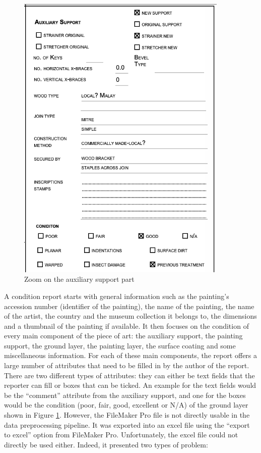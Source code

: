 \documentclass[11pt, oneside]{article}
\begin{document}
\begin{figure}[H]
\begin{minipage}{0.5\textwidth}
        \includegraphics[width=0.9\textwidth]{images/zoomOnReportFields.png} %
        \caption{Zoom on the auxiliary support part}
        \label{fig:zoomOnAuxiliary Report}
    \end{minipage}
\end{figure}

\noindent A condition report starts with general information such as the painting’s accession number (identifier of the painting), the name of the painting, the name of the artist, the country and the museum collection it belongs to, the dimensions and a thumbnail of the painting if available. It then focuses on the condition of every main component of the piece of art: the auxiliary support, the painting support, the ground layer, the painting layer, the surface coating and some miscellaneous information.
\bigbreak
\noindent For each of these main components, the report offers a large number of attributes that need to be filled in by the author of the report. There are two different types of attributes: they can either be text fields that the reporter can fill or boxes that can be ticked. An example for the text fields would be the ``comment” attribute from the auxiliary support, and one for the boxes would be the condition (poor, fair, good, excellent or N/A) of the ground layer shown in Figure \ref{fig:zoomOnAuxiliary Report}.
\bigbreak
\noindent However, the FileMaker Pro file is not directly usable in the data preprocessing pipeline. It was exported into an excel file using the ``export to excel” option from FileMaker Pro. Unfortunately, the excel file could not directly be used either. Indeed, it presented two types of problem:
\end{document}
